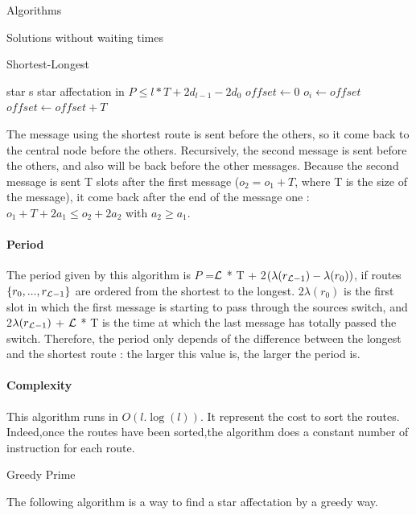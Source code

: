 \documentclass[a4paper,10pt]{report}
\begin{document}
\begin{chapter}{Algorithms}
\begin{section}{Solutions without waiting times}
\begin{subsection}{Shortest-Longest}
\begin{algorithm}[H]
\caption{Star affectation from shortest to longest}
\begin{algorithmic}

\REQUIRE star s
\ENSURE star affectation in $P \le l*T + 2d_{l-1} - 2d_0$
\STATE $offset \leftarrow 0$
\STATE $o_i \leftarrow offset$
\STATE $offset \leftarrow offset+T$
\ENDFOR

\end{algorithmic}
\end{algorithm}


The message using the shortest route is sent before the others, so it come back to the central node before the others.
Recursively, the second message is sent before the others, and also will be back before the other messages. 
Because the second message is sent T slots after the first message ($o_2 = o_1 + T$, where T is the size of the message), it come back after
the end of the message one : $o_1+ T + 2a_1 \le o_2 + 2a_2$ with $a_2 \ge a_1$.

\paragraph{Period}
The period given by this algorithm is $P$ =${\cal L}$ * T + 2$(\lambda(r_{{\cal L}-1}) - \lambda(r_0))$, if routes $\{r_0,...,r_{{\cal L}-1}\}$ are ordered
from the shortest to the longest. 2$\lambda(r_0)$ is the first slot in which the first message is starting to pass through the sources switch,
and 2$\lambda(r_{{\cal L}-1})$ + ${\cal L}$ * T  is the time at which the last message has totally passed the switch.
Therefore, the period only depends of the difference between the longest and the shortest route : the larger this value is, the larger
the period is.

\paragraph{Complexity}
This algorithm runs in $O(l.\log(l))$. It represent the cost to sort the routes.
Indeed,once the routes have been sorted,the algorithm does a constant number of instruction for each route.
\end{subsection}

\begin{subsection}{Greedy Prime}

The following algorithm is a way to find a star affectation by a greedy way.


\end{subsection}
\end{section}
\end{chapter}
\end{document}
